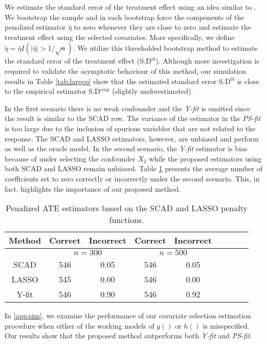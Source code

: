 \documentclass[11pt]{statsoc}
\begin{document}
We estimate the standard error of the treatment effect using an idea similar to \cite{chatterjee2011bootstrapping}. We bootstrap the sample and in each bootstrap force the components of the penalized estimator $\hat \eta$ to zero whenever they are close to zero and estimate the treatment effect using the selected covariates. More specifically, we define $\tilde \eta =\hat \eta I(|\hat \eta|> 1/\sqrt n )$. We utilize this thresholded bootstrap method to estimate the standard error of the treatment effect (S.D$^{tb}$). Although more investigation is required to validate the asymptotic behaviour of this method, our simulation results in Table \ref{tab:largep} show that the estimated standard error S.D$^{tb}$ is close to  the empirical estimator S.D$^{emp}$ (slightly underestimated). 

 In the first scenario  there is no weak confounder and the  {\it {Y-fit}} is omitted since the result is similar to the SCAD row. The variance of the estimator in the {\it{PS-fit}} is too large due to the inclusion of  spurious variables that are not related to the response. The SCAD and LASSO estimators, however, are unbiased and perform as well as the oracle model. In the second scenario, the {\it {Y-fit}} estimator is bias because of under selecting the confounder $X_2$ while the proposed estimators using both SCAD and LASSO  remain unbiased.  Table \ref{tab:largep2} presents the average number of coefficients set to zero correctly or incorrectly under the second scenario. This, in fact, highlights the importance of our proposed method.  

\begin{table} 
\caption{ {\small { Penalized ATE estimators based on the SCAD and LASSO penalty functions.  }}}\centering
\begin{tabular}{c c c  |c c c c c c} \hline
Method  & \multicolumn{1}{c}{Correct} & \multicolumn{1}{c}{Incorrect}
 & \multicolumn{1}{c}{Correct} & \multicolumn{1}{c}{Incorrect}\\
\hline
  & \multicolumn{2}{c}{$n=300$} & \multicolumn{2}{c}{$n=500$}\\
SCAD   &546 &0.05  &   546 &0.05    \\
LASSO &545 &0.00   &  546 &0.00   \\
 Y-fit      &546 &0.90   &   546 &0.92   \\           \hline
\end{tabular}
\label{tab:largep2}
\end{table}

In \ref{app:sim}, we examine the performance of our covariate selection estimation procedure when either of the working models of $g()$ or $h()$ is misspecified. Our results show that the proposed method outperforms both {\it {Y-fit}} and {\it {PS-fit}}.  
\end{document}
